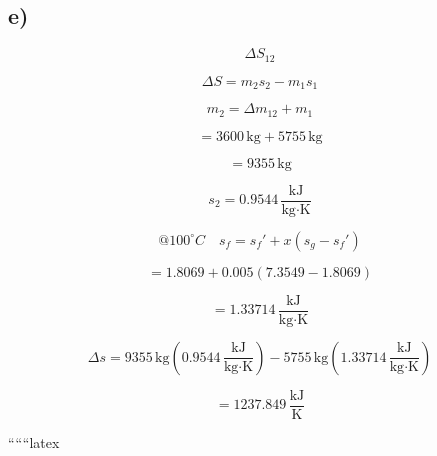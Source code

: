 

\subsection*{e)}

\[
\Delta S_{12}
\]

\[
\Delta S = m_2 s_2 - m_1 s_1
\]

\[
m_2 = \Delta m_{12} + m_1
\]

\[
= 3600 \, \text{kg} + 5755 \, \text{kg}
\]

\[
= 9355 \, \text{kg}
\]

\[
s_2 = 0.9544 \, \frac{\text{kJ}}{\text{kg} \cdot \text{K}}
\]

\[
@ 100^\circ C \quad s_f = s_f' + x (s_g - s_f')
\]

\[
= 1.8069 + 0.005 (7.3549 - 1.8069)
\]

\[
= 1.33714 \, \frac{\text{kJ}}{\text{kg} \cdot \text{K}}
\]

\[
\Delta s = 9355 \, \text{kg} \left( 0.9544 \, \frac{\text{kJ}}{\text{kg} \cdot \text{K}} \right) - 5755 \, \text{kg} \left( 1.33714 \, \frac{\text{kJ}}{\text{kg} \cdot \text{K}} \right)
\]

\[
= 1237.849 \, \frac{\text{kJ}}{\text{K}}
\]

``````latex